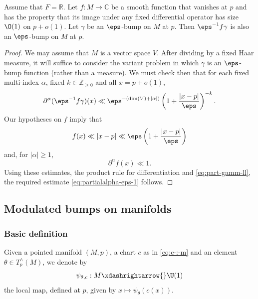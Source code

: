 \begin{lemma}\label{lem:standard2:let-f-vanish-at-p-eps-bump}
  Assume that $F = \mathbb{R}$.  Let $f : M \rightarrow \mathbb{C}$ be a smooth function that vanishes at $p$ and has the property that its image under any fixed differential operator has size $\O(1)$ on $p + o(1)$.  Let $\gamma$ be an $\eps$-bump on $M$ at $p$.  Then $\eps^{-1} f \gamma$ is also an $\eps$-bump on $M$ at $p$.
\end{lemma}
\begin{proof}
  We may assume that $M$ is a vector space $V$.  After dividing by a fixed Haar measure, it will suffice to consider the variant problem in which $\gamma$ is an $\eps$-bump function (rather than a measure).  We must check then that for each fixed multi-index $\alpha$, fixed $k \in \mathbb{Z}_{\geq 0}$ and all $x = p + o(1)$,
  \begin{equation}\label{eq:partialalpha-eps-1}
    \partial^\alpha (\eps^{-1} f  \gamma)(x) \ll \eps^{ -(\dim (V) + |\alpha|)}  \left( 1 + \frac{|x-p|}{\eps} \right)^{-k}.
  \end{equation}
  Our hypotheses on $f$ imply that
  \begin{equation*}
    f(x) \ll |x - p| \ll \eps \left( 1 + \frac{|x-p|}{\eps } \right)
  \end{equation*}
  and, for $|\alpha| \geq 1$,
  \begin{equation*}
    \partial^\alpha f(x) \ll 1.
  \end{equation*}
  Using these estimates, the product rule for differentiation and \eqref{eq:part-gamm-ll}, the required estimate \eqref{eq:partialalpha-eps-1} follows.
\end{proof}

\subsection{Modulated bumps on manifolds}\label{sec:class-bumps}

\subsubsection{Basic definition}

\begin{definition}\label{defn:standard2:given-point-manif}
  Given a pointed manifold $(M,p)$, a chart $c$ as in \eqref{eq:c-:-m} and an element $\theta \in T_p^\wedge(M)$, we denote by
  \begin{equation*}
    \psi_{\theta,c} : M \xdashrightarrow{} \U(1)
  \end{equation*}
  the local map, defined at $p$, given by $x \mapsto \psi_\theta(c(x))$.
\end{definition}

